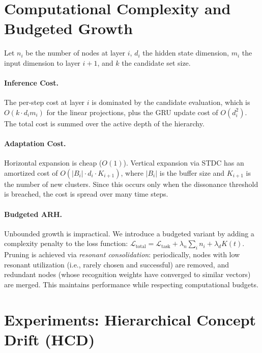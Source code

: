 \documentclass{article}
\begin{document}
\section{Computational Complexity and Budgeted Growth}
Let $n_i$ be the number of nodes at layer $i$, $d_i$ the hidden state dimension, $m_i$ the input dimension to layer $i+1$, and $k$ the candidate set size.
\paragraph{Inference Cost.} The per-step cost at layer $i$ is dominated by the candidate evaluation, which is $O(k \cdot d_i m_i)$ for the linear projections, plus the GRU update cost of $O(d_i^2)$. The total cost is summed over the active depth of the hierarchy.
\paragraph{Adaptation Cost.} Horizontal expansion is cheap ($O(1)$). Vertical expansion via STDC has an amortized cost of $O(|B_i| \cdot d_i \cdot K_{i+1})$, where $|B_i|$ is the buffer size and $K_{i+1}$ is the number of new clusters. Since this occurs only when the dissonance threshold is breached, the cost is spread over many time steps.

\paragraph{Budgeted ARH.} Unbounded growth is impractical. We introduce a budgeted variant by adding a complexity penalty to the loss function: $\mathcal{L}_{\text{total}} = \mathcal{L}_{\text{task}} + \lambda_n \sum_i n_i + \lambda_d K(t)$. Pruning is achieved via \emph{resonant consolidation}: periodically, nodes with low resonant utilization (i.e., rarely chosen and successful) are removed, and redundant nodes (whose recognition weights have converged to similar vectors) are merged. This maintains performance while respecting computational budgets.

\section{Experiments: Hierarchical Concept Drift (HCD)}
\end{document}
